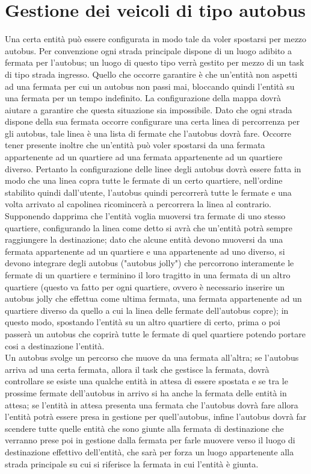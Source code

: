 \section{Gestione dei veicoli di tipo autobus}
Una certa entità può essere configurata in modo tale da voler spostarsi per mezzo autobus. Per convenzione ogni strada principale dispone di un luogo adibito a fermata per l'autobus; un luogo di questo tipo verrà gestito per mezzo di un task di tipo strada ingresso. Quello che occorre garantire è che un'entità non aspetti ad una fermata per cui un autobus non passi mai, bloccando quindi l'entità su una fermata per un tempo indefinito. La configurazione della mappa dovrà aiutare a garantire che questa situazione sia impossibile. Dato che ogni strada dispone della sua fermata occorre configurare una certa linea di percorrenza per gli autobus, tale linea è una lista di fermate che l'autobus dovrà fare. Occorre tener presente inoltre che un'entità può voler spostarsi da una fermata appartenente ad un quartiere ad una fermata appartenente ad un quartiere diverso. Pertanto la configurazione delle linee degli autobus dovrà essere fatta in modo che una linea copra tutte le fermate di un certo quartiere, nell'ordine stabilito quindi dall'utente, l'autobus quindi percorrerà tutte le fermate e una volta arrivato al capolinea ricomincerà a percorrera la linea al contrario. Supponendo dapprima che l'entità voglia muoversi tra fermate di uno stesso quartiere, configurando la linea come detto si avrà che un'entità potrà sempre raggiungere la destinazione; dato che alcune entità devono muoversi da una fermata appartenente ad un quartiere e una appartenente ad uno diverso, si devono integrare degli autobus ("autobus jolly") che percorrono interamente le fermate di un quartiere e terminino il loro tragitto in una fermata di un altro quartiere (questo va fatto per ogni quartiere, ovvero è necessario inserire un autobus jolly che effettua come ultima fermata, una fermata appartenente ad un quartiere diverso da quello a cui la linea delle fermate dell'autobus copre); in questo modo, spostando l'entità su un altro quartiere di certo, prima o poi passerà un autobus che coprirà tutte le fermate di quel quartiere potendo portare cosi a destinazione l'entità.\\
Un autobus svolge un percorso che muove da una fermata all'altra; se l'autobus arriva ad una certa fermata, allora il task che gestisce la fermata, dovrà controllare se esiste una qualche entità in attesa di essere spostata e se tra le prossime fermate dell'autobus in arrivo si ha anche la fermata delle entità in attesa; se l'entità in attesa presenta una fermata che l'autobus dovrà fare allora l'entità potrà essere presa in gestione per quell'autobus, infine l'autobus dovrà far scendere tutte quelle entità che sono giunte alla fermata di destinazione che verranno prese poi in gestione dalla fermata per farle muovere verso il luogo di destinazione effettivo dell'entità, che sarà per forza un luogo appartenente alla strada principale su cui si riferisce la fermata in cui l'entità è giunta. \\
